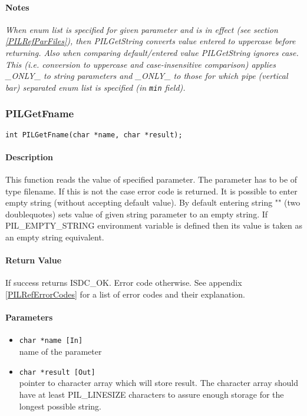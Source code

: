 \paragraph{Notes\\}
{\it
When enum list is specified for given parameter and is in effect (see
section \ref{PILRefParFiles}), then PILGetString converts value
entered to uppercase before returning. Also when comparing default/entered
value PILGetString ignores case. This (i.e. conversion to uppercase
and case-insensitive comparison) applies \_ONLY\_ to string parameters
and \_ONLY\_ to those for which pipe (vertical bar) separated enum list is 
specified (in {\tt min} field).
}



\subsubsection{PILGetFname}

\begin{verbatim}
int PILGetFname(char *name, char *result); 
\end{verbatim}

\paragraph{Description\\}
This function reads the value of specified parameter. The parameter has to
be of type filename. If this is not the case error code is returned. 
It is possible to enter empty string (without accepting default value).
By default entering string "" (two doublequotes) sets value of given string
parameter to an empty string. If PIL\_EMPTY\_STRING environment variable
is defined then its value is taken as an empty string equivalent.

\paragraph{Return Value\\}
If success returns ISDC\_OK. Error code otherwise. See appendix \ref{PILRefErrorCodes}
for a list of error codes and their explanation.

\paragraph{Parameters}
\begin{itemize}
\item
{\tt char *name [In] } \\
name of the parameter
\item
{\tt char *result [Out] } \\
pointer to character array which will store result. The character array
should have at least PIL\_LINESIZE characters to assure enough storage for
the longest possible string.
\end{itemize}

